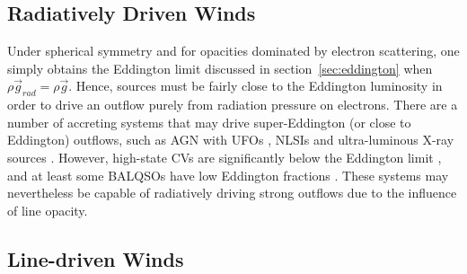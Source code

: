 \subsection{Radiatively Driven Winds}
\label{sec:rad_winds}
Under spherical symmetry and for opacities dominated by electron scattering, 
one simply obtains the Eddington limit discussed
in section~\ref{sec:eddington} when $\rho \vec{g}_{rad} = \rho \vec{g}$. 
Hence, sources must be fairly close to the Eddington luminosity in order 
to drive an outflow purely from radiation 
pressure on electrons. There are a number of accreting systems that may drive
super-Eddington (or close to Eddington) outflows, 
such as AGN with UFOs \citep[e.g.][]{reeves2002,pounds2016},
NLSIs \citep{done2015} and ultra-luminous X-ray sources \citep[ULXs;][]{walton2013}.
However, high-state CVs are significantly below the Eddington limit 
\citep{warnerbook}, and at least some BALQSOs have low Eddington fractions 
\citep[$\sim25\%$ have $L/L_{\mathrm{Edd}}<0.1$;][]{grupenousek2015}.
These systems may nevertheless be capable of radiatively driving strong 
outflows due to the influence of line opacity.

\subsection{Line-driven Winds}

